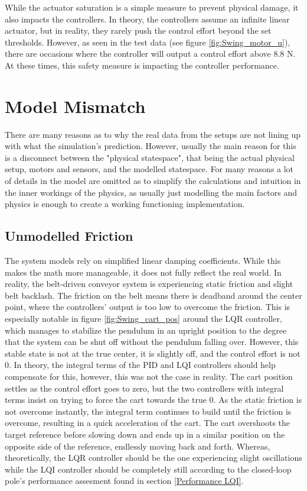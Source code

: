 While the actuator saturation is a simple measure to prevent physical damage, it also impacts the controllers. In theory, the controllers assume an infinite linear actuator, but in reality, they rarely push the control effort beyond the set thresholds. However, as seen in the test data (see figure \ref{fig:Swing_motor_u}), there are occasions where the controller will output a control effort above 8.8 N. At these times, this safety measure is impacting the controller performance.

\section{Model Mismatch}
There are many reasons as to why the real data from the setups are not lining up with what the simulation's prediction. However, usually the main reason for this is a disconnect between the "physical statespace", that being the actual physical setup, motors and sensors, and the modelled statespace. For many reasons a lot of details in the model are omitted as to simplify the calculations and intuition in the inner workings of the physics, as usually just modelling the main factors and physics is enough to create a working functioning implementation.

\subsection{Unmodelled Friction} \label{Unmodelled Friction}
The system models rely on simplified linear damping coefficients. While this makes the math more manageable, it does not fully reflect the real world. In reality, the belt-driven conveyor system is experiencing static friction and slight belt backlash. The friction on the belt means there is deadband around the center point, where the controllers' output is too low to overcome the friction. This is especially notable in figure \ref{fig:Swing_cart_pos} around the LQR controller, which manages to stabilize the pendulum in an upright position to the degree that the system can be shut off without the pendulum falling over. However, this stable state is not at the true center, it is slightly off, and the control effort is not 0. In theory, the integral terms of the PID and LQI controllers should help compensate for this, however, this was not the case in reality. The cart position settles as the control effort goes to zero, but the two controllers with integral terms insist on trying to force the cart towards the true 0. As the static friction is not overcome instantly, the integral term continues to build until the friction is overcome, resulting in a quick acceleration of the cart. The cart overshoots the target reference before slowing down and ends up in a similar position on the opposite side of the reference, endlessly moving back and forth. Whereas, theoretically, the LQR controller should be the one experiencing slight oscillations while the LQI controller should be completely still according to the closed-loop pole's performance assesment found in section \ref{Performance LQI}.

